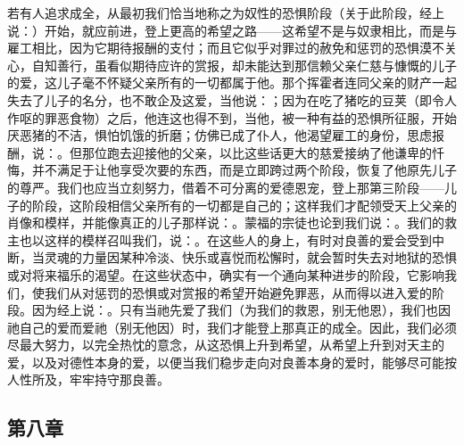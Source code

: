 若有人追求成全，从最初我们恰当地称之为奴性的恐惧阶段（关于此阶段，经上说：）开始，就应前进，登上更高的希望之路——这希望不是与奴隶相比，而是与雇工相比，因为它期待报酬的支付；而且它似乎对罪过的赦免和惩罚的恐惧漠不关心，自知善行，虽看似期待应许的赏报，却未能达到那信赖父亲仁慈与慷慨的儿子的爱，这儿子毫不怀疑父亲所有的一切都属于他。那个挥霍者连同父亲的财产一起失去了儿子的名分，也不敢企及这爱，当他说：；因为在吃了猪吃的豆荚（即令人作呕的罪恶食物）之后，他连这也得不到，当他，被一种有益的恐惧所征服，开始厌恶猪的不洁，惧怕饥饿的折磨；仿佛已成了仆人，他渴望雇工的身份，思虑报酬，说：。但那位跑去迎接他的父亲，以比这些话更大的慈爱接纳了他谦卑的忏悔，并不满足于让他享受次要的东西，而是立即跨过两个阶段，恢复了他原先儿子的尊严。我们也应当立刻努力，借着不可分离的爱德恩宠，登上那第三阶段——儿子的阶段，这阶段相信父亲所有的一切都是自己的；这样我们才配领受天上父亲的肖像和模样，并能像真正的儿子那样说：。蒙福的宗徒也论到我们说：。我们的救主也以这样的模样召叫我们，说：。在这些人的身上，有时对良善的爱会受到中断，当灵魂的力量因某种冷淡、快乐或喜悦而松懈时，就会暂时失去对地狱的恐惧或对将来福乐的渴望。在这些状态中，确实有一个通向某种进步的阶段，它影响我们，使我们从对惩罚的恐惧或对赏报的希望开始避免罪恶，从而得以进入爱的阶段。因为经上说：。只有当祂先爱了我们（为我们的救恩，别无他恩），我们也因祂自己的爱而爱祂（别无他因）时，我们才能登上那真正的成全。因此，我们必须尽最大努力，以完全热忱的意念，从这恐惧上升到希望，从希望上升到对天主的爱，以及对德性本身的爱，以便当我们稳步走向对良善本身的爱时，能够尽可能按人性所及，牢牢持守那良善。\par


\subsection{第八章}

